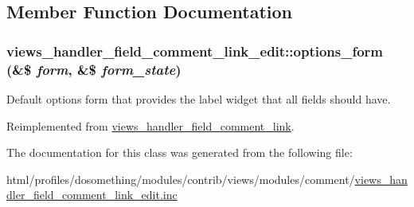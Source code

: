 \subsection{Member Function Documentation}
\hypertarget{classviews__handler__field__comment__link__edit_acabe2521c15d2c3d8e48cff803bb3def}{
\subsubsection[{options\_\-form}]{\setlength{\rightskip}{0pt plus 5cm}views\_\-handler\_\-field\_\-comment\_\-link\_\-edit::options\_\-form (\&\$ {\em form}, \/  \&\$ {\em form\_\-state})}}
\label{classviews__handler__field__comment__link__edit_acabe2521c15d2c3d8e48cff803bb3def}
Default options form that provides the label widget that all fields should have. 

Reimplemented from \hyperlink{classviews__handler__field__comment__link_a82957426a30584198c79c78804265bdc}{views\_\-handler\_\-field\_\-comment\_\-link}.

The documentation for this class was generated from the following file:\begin{DoxyCompactItemize}
\item 
html/profiles/dosomething/modules/contrib/views/modules/comment/\hyperlink{views__handler__field__comment__link__edit_8inc}{views\_\-handler\_\-field\_\-comment\_\-link\_\-edit.inc}\end{DoxyCompactItemize}
